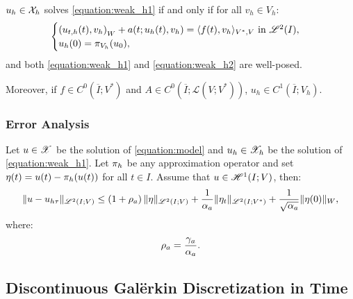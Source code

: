 \begin{proposition}[Equivalence]
    $u_h \in \mathcal{X}_h$ solves \eqref{equation:weak_h1} if and only if for all $v_h \in V_h$:
    \begin{gather}
        \begin{cases} \label{equation:weak_h2}
            \left( u_{t, h}(t), v_h \right)_W + a(t; u_h(t), v_h) = \langle f(t), v_h \rangle_{V^*, V} \text{ in } \mathscr{L}^{2}(I), \\
            u_h(0) = \pi_{V_h}(u_0),
        \end{cases}
    \end{gather}
    and both \eqref{equation:weak_h1} and \eqref{equation:weak_h2} are well-posed.

    Moreover, if $f \in C^0(\overline{I}; V^*)$ and $A \in C^0(\overline{I}; \mathcal{L}(V; V^*))$, $u_h \in C^1(\overline{I}; V_h)$.
\end{proposition}

\subsubsection{Error Analysis}




\begin{theorem} \label{theorem:estimate_h}
    Let $u \in \mathscr{X}$ be the solution of \eqref{equation:model} and $u_h \in \mathscr{X}_h$ be the solution of \eqref{equation:weak_h1}. Let $\pi_h$ be any approximation operator and set $\eta(t) = u(t) - \pi_h(u(t))$ for all $t \in I$. Assume that $u \in \mathscr{H}^{1}(I; V)$, then:
    \begin{gather}
        \lVert u - u_{h \tau} \rVert_{\mathscr{L}^{2}(I; V)} \leq \left( 1 + \rho_{a} \right) \lVert \eta \rVert_{\mathscr{L}^{2}(I; V)} + \frac{1}{\alpha_{a}} \lVert \eta_t \rVert_{\mathscr{L}^{2}(I; V^*)} + \frac{1}{\sqrt{\alpha_{a}}} \lVert \eta(0) \rVert_W,
    \end{gather}
    where:
    \begin{gather}
        \rho_{a} = \frac{\gamma_{a}}{\alpha_{a}}.
    \end{gather}
\end{theorem}

\newpage
\subsection{Discontinuous Galërkin Discretization in Time}

